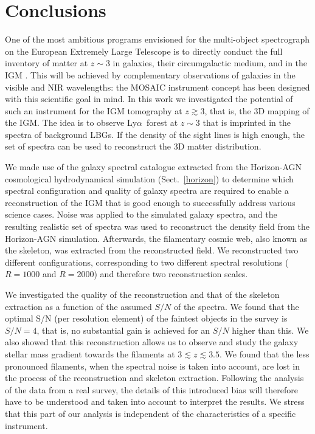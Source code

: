 \documentclass{aa}
\newcommand{\lya}{Ly$\alpha$}
\begin{document}
\section{Conclusions}

One of the most ambitious programs envisioned for the multi-object spectrograph on the European Extremely Large Telescope is to directly conduct the full inventory of matter at $z \sim 3$ in galaxies, their circumgalactic medium, and in the IGM \citep{Puech2018}. This will be achieved by complementary observations of galaxies in the visible and NIR wavelengths: the MOSAIC instrument concept \citep{Morris2018} has been designed with this scientific goal in mind. In this work we investigated the potential of such an instrument for the IGM tomography at $z \gtrsim 3$, that is, the 3D mapping of the IGM. The idea is to observe \lya\, forest at $z\sim 3$ that is imprinted in the spectra of background LBGs. If the density of the sight lines is high enough, the set of spectra can be used to reconstruct the 3D matter distribution.

We made use of the galaxy spectral catalogue extracted from the {\sc Horizon-AGN} cosmological hydrodynamical simulation (Sect.~\ref{horizon}) to determine which spectral configuration and quality of galaxy spectra are required to enable a reconstruction of the IGM that is good enough to successfully address various science cases. Noise was applied to the simulated galaxy spectra, and the resulting realistic set of spectra was used to reconstruct the density field from the {\sc Horizon-AGN} simulation. Afterwards, the filamentary cosmic web, also known as the skeleton, was extracted from the reconstructed field. We reconstructed two different configurations, corresponding to two different spectral resolutions ($R=1000$ and $R=2000$) and therefore two reconstruction scales.

We investigated the quality of the reconstruction and that of the skeleton extraction as a function of the assumed $S/N$ of the spectra. We found that the optimal S/N (per resolution element) of the faintest objects in the survey is $S/N = 4$, that is, no substantial gain is achieved for an $S/N$ higher than this. We also showed that this reconstruction allows us to observe and study the galaxy stellar mass gradient towards the filaments at $3 \lesssim z \lesssim 3.5$. We found that the less pronounced filaments, when the spectral noise is taken into account, are lost in the process of the reconstruction and skeleton extraction. Following the analysis of the data from a real survey, the details of this introduced bias will therefore have to be understood and taken into account to interpret the results. We stress that this part of our analysis is independent of the characteristics of a specific instrument.
\end{document}
